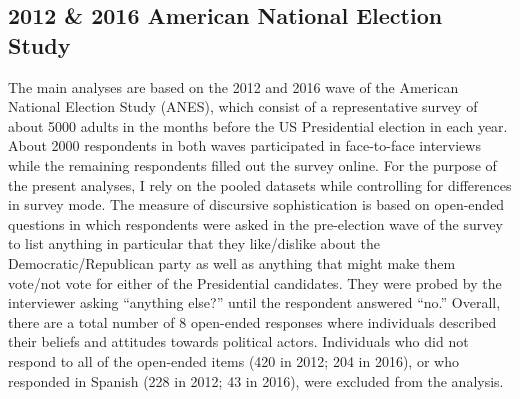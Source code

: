 \subsection{2012 \& 2016 American National Election Study}
The main analyses are based on the 2012 and 2016 wave of the American National Election Study (ANES), which consist of a representative survey of about 5000 adults in the months before the US Presidential election in each year. About 2000 respondents in both waves participated in face-to-face interviews while the remaining respondents filled out the survey online. For the purpose of the present analyses, I rely on the pooled datasets while controlling for differences in survey mode. The measure of discursive sophistication is based on open-ended questions in which respondents were asked in the pre-election wave of the survey to list anything in particular that they like/dislike about the Democratic/Republican party as well as anything that might make them vote/not vote for either of the Presidential candidates. They were probed by the interviewer asking ``anything else?'' until the respondent answered ``no.'' Overall, there are a total number of 8 open-ended responses where individuals described their beliefs and attitudes towards political actors. Individuals who did not respond to all of the open-ended items (420 in 2012; 204 in 2016), or who responded in Spanish (228 in 2012; 43 in 2016), were excluded from the analysis.


